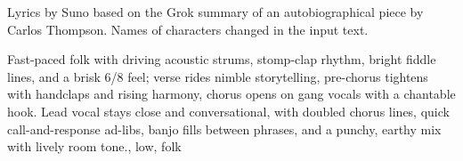 

\begin{notes}
Lyrics by Suno based on the Grok summary of an autobiographical piece by Carlos Thompson. %
Names of characters changed in the input text.
\end{notes}

\begin{style}
Fast-paced folk with driving acoustic strums, stomp-clap rhythm, bright fiddle lines, and a brisk 6/8 feel; verse rides nimble storytelling, pre-chorus tightens with handclaps and rising harmony, chorus opens on gang vocals with a chantable hook. %
Lead vocal stays close and conversational, with doubled chorus lines, quick call-and-response ad-libs, banjo fills between phrases, and a punchy, earthy mix with lively room tone., low, folk
\end{style}

